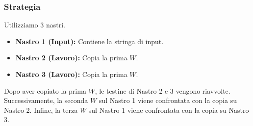 \documentclass[a4paper]{article}
\theoremstyle{definition} %
\begin{document}
\subsubsection{Strategia}
Utilizziamo 3 nastri.
\begin{itemize}
    \item \textbf{Nastro 1 (Input):} Contiene la stringa di input.
    \item \textbf{Nastro 2 (Lavoro):} Copia la prima $W$.
    \item \textbf{Nastro 3 (Lavoro):} Copia la prima $W$.
\end{itemize}
Dopo aver copiato la prima $W$, le testine di Nastro 2 e 3 vengono riavvolte. Successivamente, la seconda $W$ sul Nastro 1 viene confrontata con la copia su Nastro 2. Infine, la terza $W$ sul Nastro 1 viene confrontata con la copia su Nastro 3.
\end{document}
